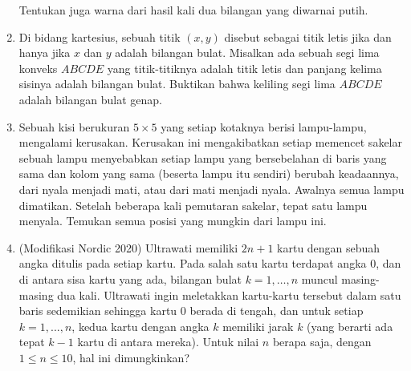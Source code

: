\documentclass[11pt]{scrartcl}
\begin{document}
\begin{enumerate}[resume]
    Tentukan juga warna dari hasil kali dua bilangan yang diwarnai putih.


\item
    Di bidang kartesius, sebuah titik $(x,y)$ disebut sebagai titik letis jika dan
hanya jika $x$ dan $y$ adalah bilangan bulat. Misalkan ada sebuah segi lima konveks $ABCDE$
yang titik-titiknya adalah titik letis dan panjang kelima sisinya adalah bilangan bulat.
Buktikan bahwa keliling segi lima $ABCDE$ adalah bilangan bulat genap.


\item
    Sebuah kisi berukuran $5 \times 5$ yang setiap kotaknya berisi lampu-lampu, mengalami kerusakan. Kerusakan ini mengakibatkan setiap memencet sakelar sebuah lampu menyebabkan setiap lampu yang bersebelahan di baris yang sama dan kolom yang sama (beserta lampu itu sendiri) berubah keadaannya, dari nyala menjadi mati, atau dari mati menjadi nyala. Awalnya semua lampu dimatikan. Setelah beberapa kali pemutaran sakelar, tepat satu lampu menyala. Temukan semua posisi yang mungkin dari lampu ini.


\item
    (Modifikasi Nordic 2020) Ultrawati memiliki $2n + 1$ kartu dengan sebuah angka ditulis pada setiap kartu. Pada salah satu kartu terdapat angka 0, dan di antara sisa kartu yang ada, bilangan bulat $k = 1, \dots, n$ muncul masing-masing dua kali. Ultrawati ingin meletakkan kartu-kartu tersebut dalam satu baris sedemikian sehingga kartu 0 berada di tengah, dan untuk setiap $k = 1, ..., n$, kedua kartu dengan angka $k$ memiliki jarak $k$ (yang berarti ada tepat $k - 1$ kartu di antara mereka). Untuk nilai $n$ berapa saja, dengan $1 \le n \le 10$, hal ini dimungkinkan?
\end{enumerate}
\end{document}
